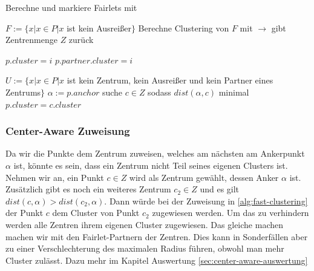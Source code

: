         
            \begin{algorithm}
                \caption{Fast-Anchor Clustering Algorithmus}\label{alg:fast-clustering}
                \begin{algorithmic}[1]
                        \State Berechne und markiere Fairlets mit 
    
                        \State $F := \{x | x \in P | x$ ist kein Ausreißer$\}$ 
                        \State Berechne Clustering von $F$ mit 
                        \State $\longrightarrow$ gibt Zentrenmenge $Z$ zurück
                        \State
                        
                         
                                \State $p.cluster = i$
                                \State $p.partner.cluster = i$
                            \EndIf 
                        \EndFor
                        \State
    
                        \State $U := \{x | x \in P | x $ ist kein Zentrum, kein Ausreißer und kein Partner eines Zentrums$\}$ 
                            \State $\alpha := p.anchor$
                            \State suche $c \in Z$ sodass $dist(\alpha, c)$ minimal
                            \State $p.cluster = c.cluster$
                        \EndFor
                    \EndFunction
                \end{algorithmic}
            \end{algorithm} 
        

        \subsubsection{Center-Aware Zuweisung}
            Da wir die Punkte dem Zentrum zuweisen, welches am nächsten am Ankerpunkt $\alpha$ ist, könnte es sein, dass ein Zentrum nicht Teil seines eigenen Clusters ist. Nehmen wir an, ein Punkt $c \in Z$ wird als Zentrum gewählt, dessen Anker $\alpha$ ist. Zusätzlich gibt es noch ein weiteres Zentrum $c_2 \in Z$ und es gilt $dist(c, \alpha) > dist(c_2, \alpha)$. Dann würde bei der Zuweisung in \ref{alg:fast-clustering} der Punkt $c$ dem Cluster von Punkt $c_2$ zugewiesen werden. Um das zu verhindern werden alle Zentren ihrem eigenen Cluster zugewiesen. Das gleiche machen machen wir mit den Fairlet-Partnern der Zentren.\newline
            Dies kann in Sonderfällen aber zu einer Verschlechterung des maximalen Radius führen, obwohl man mehr Cluster zulässt. Dazu mehr im Kapitel Auswertung \ref{sec:center-aware-auswertung}
        